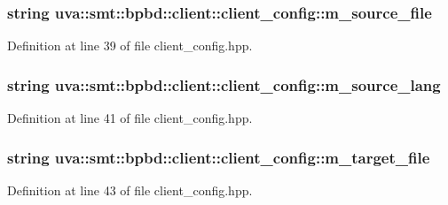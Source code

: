 \subsubsection[{m\+\_\+source\+\_\+file}]{\setlength{\rightskip}{0pt plus 5cm}string uva\+::smt\+::bpbd\+::client\+::client\+\_\+config\+::m\+\_\+source\+\_\+file}\label{structuva_1_1smt_1_1bpbd_1_1client_1_1client__config_af701ff475a04b3aca0e52176608633d1}


Definition at line 39 of file client\+\_\+config.\+hpp.

\hypertarget{structuva_1_1smt_1_1bpbd_1_1client_1_1client__config_ad4305c9bb25f61695ae893d7d384b3ab}{}
\subsubsection[{m\+\_\+source\+\_\+lang}]{\setlength{\rightskip}{0pt plus 5cm}string uva\+::smt\+::bpbd\+::client\+::client\+\_\+config\+::m\+\_\+source\+\_\+lang}\label{structuva_1_1smt_1_1bpbd_1_1client_1_1client__config_ad4305c9bb25f61695ae893d7d384b3ab}


Definition at line 41 of file client\+\_\+config.\+hpp.

\hypertarget{structuva_1_1smt_1_1bpbd_1_1client_1_1client__config_a8080ccca0fe4582b99e3bf7b03262b66}{}
\subsubsection[{m\+\_\+target\+\_\+file}]{\setlength{\rightskip}{0pt plus 5cm}string uva\+::smt\+::bpbd\+::client\+::client\+\_\+config\+::m\+\_\+target\+\_\+file}\label{structuva_1_1smt_1_1bpbd_1_1client_1_1client__config_a8080ccca0fe4582b99e3bf7b03262b66}


Definition at line 43 of file client\+\_\+config.\+hpp.

\hypertarget{structuva_1_1smt_1_1bpbd_1_1client_1_1client__config_ae891e88473325f5fced94549f79878cf}{}
